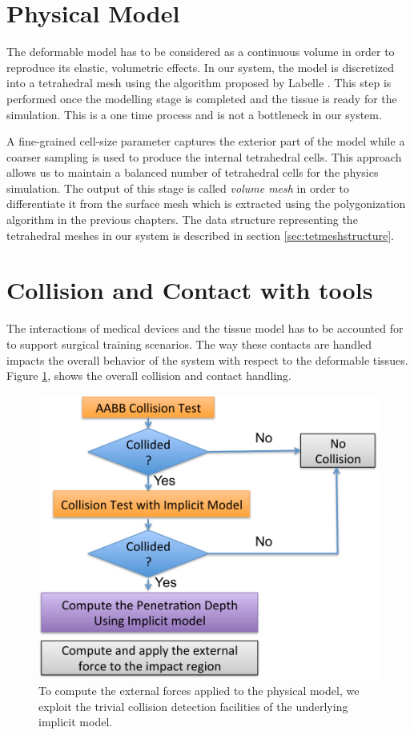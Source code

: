 \section{Physical Model}
\label{sec:physicalmodel}
The deformable model has to be considered as a continuous volume in order to reproduce its elastic, 
volumetric effects. In our system, the \blob model is discretized into a tetrahedral mesh using the 
algorithm proposed by Labelle \etal \cite{Labelle2007}. This step is performed once the modelling stage is
completed and the tissue is ready for the simulation. This is a one time process and is not a bottleneck 
in our system. 

A fine-grained cell-size parameter captures the exterior part of the model while a coarser sampling is 
used to produce the internal tetrahedral cells. This approach allows us to maintain a balanced number 
of tetrahedral cells for the physics simulation. The output of this stage is called \textit{volume mesh} in 
order to differentiate it from the surface mesh which is extracted using the polygonization algorithm in 
the previous chapters. The data structure representing the tetrahedral meshes in our system is described 
in section \ref{sec:tetmeshstructure}.


\section{Collision and Contact with tools}
\label{sec:collisionsandcontacts}
The interactions of medical devices and the tissue model has to be accounted for to support surgical 
training scenarios. The way these contacts are handled impacts the overall behavior of the system with 
respect to the deformable tissues. Figure \ref{fig:contact}, shows the overall 
collision and contact handling.

\begin{figure}[H]
  \centering
  \includegraphics[width=0.8\linewidth]{figures/deformable/contact.pdf}
  \caption{\label{fig:contact}
  {To compute the external forces applied to the physical model, we exploit the trivial collision detection 
  facilities of the underlying implicit model.}
}
\end{figure}

